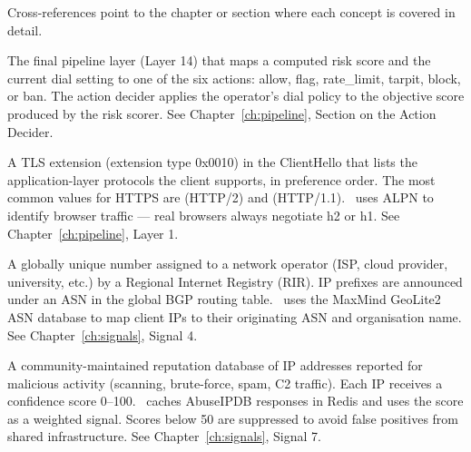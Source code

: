 

 Cross-references point to the chapter or
section where each concept is covered in detail.

\begin{description}[leftmargin=0pt, style=nextline, itemsep=8pt]

  \item[Action decider\index{action decider}]
  The final pipeline layer (Layer 14) that maps a computed risk score and the current
  dial setting to one of the six actions: allow, flag, rate\_limit, tarpit, block, or
  ban. The action decider applies the operator's dial policy to the objective score
  produced by the risk scorer.
  See Chapter~\ref{ch:pipeline}, Section on the Action Decider.

  \item[ALPN (Application-Layer Protocol Negotiation)\index{ALPN}]
  A TLS extension (extension type 0x0010) in the ClientHello that lists the
  application-layer protocols the client supports, in preference order. The most common
  values for HTTPS are  (HTTP/2) and  (HTTP/1.1). \ja\ uses ALPN
  to identify browser traffic — real browsers always negotiate h2 or h1.
  See Chapter~\ref{ch:pipeline}, Layer 1.

  \item[ASN (Autonomous System Number)\index{ASN}]
  A globally unique number assigned to a network operator (ISP, cloud provider,
  university, etc.) by a Regional Internet Registry (RIR). IP prefixes are announced
  under an ASN in the global BGP routing table. \ja\ uses the MaxMind GeoLite2 ASN
  database to map client IPs to their originating ASN and organisation name.
  See Chapter~\ref{ch:signals}, Signal 4.

  \item[AbuseIPDB\index{AbuseIPDB}]
  A community-maintained reputation database of IP addresses reported for malicious
  activity (scanning, brute-force, spam, C2 traffic). Each IP receives a confidence
  score 0–100. \ja\ caches AbuseIPDB responses in Redis and uses the score as a
  weighted signal. Scores below 50 are suppressed to avoid false positives from
  shared infrastructure.
  See Chapter~\ref{ch:signals}, Signal 7.


\end{description}
